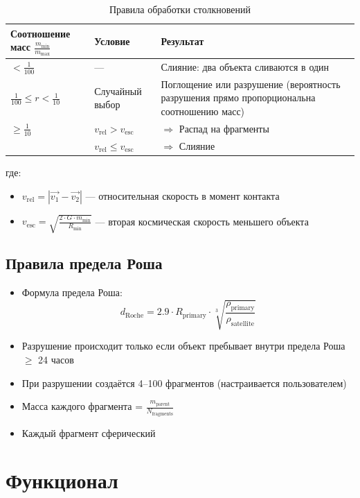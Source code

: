 \documentclass[14pt]{extarticle}
\begin{document}
	\begin{table}[H]
		\centering
		\begin{tabular}{l l p{6cm}}
			\toprule
			Соотношение масс $\frac{m_{\min}}{m_{\max}}$ & Условие & Результат \\
			\midrule
			$< \frac{1}{100}$ & --- & Слияние: два объекта сливаются в один \\
			\midrule
			$\frac{1}{100} \leq r < \frac{1}{10}$ & Случайный выбор & Поглощение или разрушение (вероятность разрушения прямо пропорциональна соотношению масс) \\
			\midrule
			$\geq \frac{1}{10}$ & $v_{\text{rel}} > v_{\text{esc}}$ & $\Rightarrow$ Распад на фрагменты \\
			& $v_{\text{rel}} \leq v_{\text{esc}}$ & $\Rightarrow$ Слияние\\
			\bottomrule
		\end{tabular}
		\caption{Правила обработки столкновений}
	\end{table}
	
	где:
	\begin{itemize}
		\item $v_{\text{rel}} = |\vec{v_1} - \vec{v_2}|$ --- относительная скорость в момент контакта
		\item $v_{\text{esc}} = \sqrt{\frac{2 \cdot G \cdot m_{\min}}{R_{\min}}}$ --- вторая космическая скорость меньшего объекта
	\end{itemize}
	
	\subsection{Правила предела Роша}
	\begin{itemize}
		\item Формула предела Роша:
		\[
		d_{\text{Roche}} = 2.9 \cdot R_{\text{primary}} \cdot \sqrt[3]{\frac{\rho_{\text{primary}}}{\rho_{\text{satellite}}}}
		\]
		\item Разрушение происходит только если объект пребывает внутри предела Роша $\ge$ 24 часов
		\item При разрушении создаётся 4--100 фрагментов (настраивается пользователем)
		\item Масса каждого фрагмента = $\frac{m_{\text{parent}}}{N_{\text{fragments}}}$
		\item Каждый фрагмент сферический
	\end{itemize}
	
	\section{Функционал}
	
\end{document}
